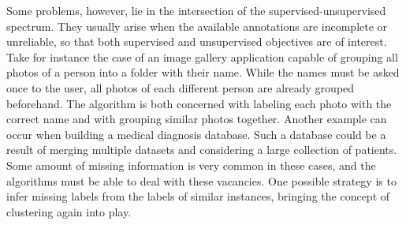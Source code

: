 Some problems, however, lie in the intersection of the supervised-unsupervised spectrum. They usually arise when the available annotations are incomplete or unreliable, so that both supervised and unsupervised objectives are of interest. Take for instance the case of an image gallery application capable of grouping all photos of a person into a folder with their name. While the names must be asked once to the user, all photos of each different person are already grouped beforehand. The algorithm is both concerned with labeling each photo with the correct name and with grouping similar photos together.
Another example can occur when building a medical diagnosis database.
Such a database could be a result of merging multiple datasets and considering a large collection of patients.
Some amount of missing information is very common in these cases, and the algorithms must be able to deal with these vacancies.
One possible strategy is to infer missing labels from the labels of similar instances, bringing the concept of clustering again into play.

